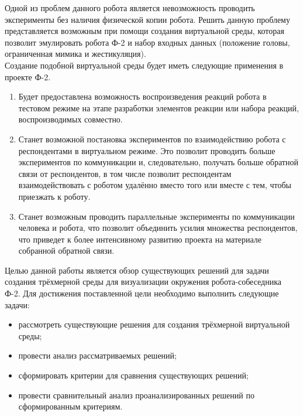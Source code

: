 Одной из проблем данного робота является невозможность проводить эксперименты без наличия физической копии робота. Решить данную проблему представляется возможным при помощи создания виртуальной среды, которая позволит эмулировать робота Ф-2 и набор входных данных (положение головы, ограниченная мимика и жестикуляция).\\

Создание подобной виртуальной среды будет иметь следующие применения в проекте Ф-2.
\begin{enumerate}
	\item Будет предоставлена возможность воспроизведения реакций робота в тестовом режиме на этапе разработки элементов реакции или набора реакций, воспроизводимых совместно.
	\item Станет возможной постановка экспериментов по взаимодействию робота с респондентами в виртуальном режиме. Это позволит проводить больше экспериментов по коммуникации и, следовательно, получать больше обратной связи от респондентов, в том числе позволит респондентам взаимодействовать с роботом удалённо вместо того или вместе с тем, чтобы приезжать к роботу.
	\item Станет возможным проводить параллельные эксперименты по коммуникации человека и робота, что позволит объединить усилия множества респондентов, что приведет к более интенсивному развитию проекта на материале собранной обратной связи.
\end{enumerate}

Целью данной работы является обзор существующих решений для задачи создания трёхмерной среды для визуализации окружения робота-собеседника Ф-2. Для достижения поставленной цели необходимо выполнить следующие задачи:
\begin{itemize}
\item рассмотреть существующие решения для создания трёхмерной виртуальной среды;
\item провести анализ рассматриваемых решений;
\item сформировать критерии для сравнения существующих решений;
\item провести сравнительный анализ проанализированных решений по сформированным критериям.
\end{itemize}
